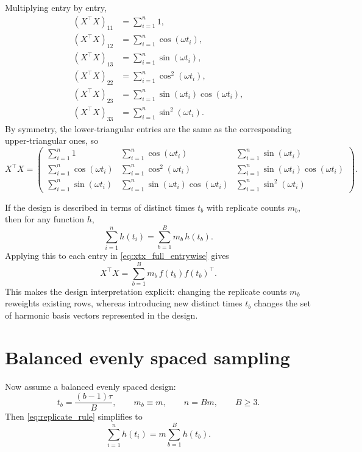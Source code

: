 \documentclass[11pt]{article}
\begin{document}
Multiplying entry by entry,
\begin{align}
(X^\top X)_{11}
&=\sum_{i=1}^n 1,\label{eq:xtx11}\\
(X^\top X)_{12}
&=\sum_{i=1}^n \cos(\omega t_i),\label{eq:xtx12}\\
(X^\top X)_{13}
&=\sum_{i=1}^n \sin(\omega t_i),\label{eq:xtx13}\\
(X^\top X)_{22}
&=\sum_{i=1}^n \cos^2(\omega t_i),\label{eq:xtx22}\\
(X^\top X)_{23}
&=\sum_{i=1}^n \sin(\omega t_i)\cos(\omega t_i),\label{eq:xtx23}\\
(X^\top X)_{33}
&=\sum_{i=1}^n \sin^2(\omega t_i).\label{eq:xtx33}
\end{align}
By symmetry, the lower-triangular entries are the same as the corresponding upper-triangular ones, so
\begin{equation}
X^\top X=
\begin{pmatrix}
\sum_{i=1}^n1 & \sum_{i=1}^n\cos(\omega t_i) & \sum_{i=1}^n\sin(\omega t_i)\\
\sum_{i=1}^n\cos(\omega t_i) & \sum_{i=1}^n\cos^2(\omega t_i) & \sum_{i=1}^n\sin(\omega t_i)\cos(\omega t_i)\\
\sum_{i=1}^n\sin(\omega t_i) & \sum_{i=1}^n\sin(\omega t_i)\cos(\omega t_i) & \sum_{i=1}^n\sin^2(\omega t_i)
\end{pmatrix}.
\label{eq:xtx_full_entrywise}
\end{equation}

If the design is described in terms of distinct times $t_b$ with replicate counts $m_b$, then for any function $h$,
\begin{equation}
\sum_{i=1}^n h(t_i)=\sum_{b=1}^B m_b\,h(t_b).
\label{eq:replicate_rule}
\end{equation}
Applying this to each entry in \eqref{eq:xtx_full_entrywise} gives
\begin{equation}
X^\top X=\sum_{b=1}^B m_b\,f(t_b)f(t_b)^\top.
\label{eq:xtx_weighted_outer}
\end{equation}
This makes the design interpretation explicit: changing the replicate counts $m_b$ reweights existing rows, whereas introducing new distinct times $t_b$ changes the set of harmonic basis vectors represented in the design.

\section{Balanced evenly spaced sampling}

Now assume a balanced evenly spaced design:
\begin{equation}
t_b=\frac{(b-1)\tau}{B},\qquad m_b\equiv m,\qquad n=Bm,\qquad B\ge 3.
\label{eq:balanced_assumption}
\end{equation}
Then \eqref{eq:replicate_rule} simplifies to
\begin{equation}
\sum_{i=1}^n h(t_i)=m\sum_{b=1}^B h(t_b).
\label{eq:replicate_rule_balanced}
\end{equation}
\end{document}

